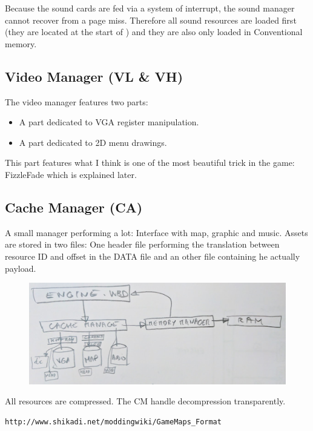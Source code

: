 \documentclass[book.tex]{subfiles}
\begin{document}
\par
{} Because the sound cards are fed via a system of interrupt, the sound manager cannot recover from a page miss. Therefore all sound resources are loaded first (they are located at the start of ) and they are also only loaded in Conventional memory.











\subsection{Video Manager (VL \& VH)}
The video manager features two parts:
\begin{itemize}
\item A part dedicated to VGA register manipulation.
\item A part dedicated to 2D menu drawings.
\end{itemize}
\par
This part features what I think is one of the most beautiful trick in the game: FizzleFade which is explained later.






\subsection{Cache Manager (CA)}
A small manager performing a lot: Interface with map, graphic and music. Assets are stored in two files: One header file performing the translation between resource ID and offset in the DATA file and an other file containing he actually payload.\\
 \par
\begin{figure}[H]
\centering
 \includegraphics[width=\textwidth]{imgs/cache_manager_architecture.png}
 \end{figure}
 \par
{} All resources are compressed. The CM handle decompression transparently.
\begin{verbatim}
http://www.shikadi.net/moddingwiki/GameMaps_Format
\end{verbatim}
\end{document}
